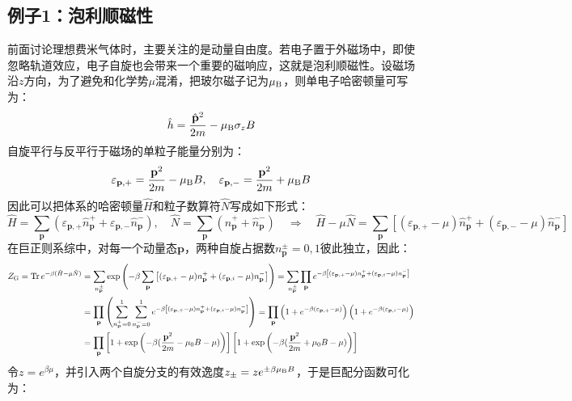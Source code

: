 \newpage
\subsection{例子1：泡利顺磁性}
前面讨论理想费米气体时，主要关注的是动量自由度。若电子置于外磁场中，即使忽略轨道效应，电子自旋也会带来一个重要的磁响应，这就是泡利顺磁性。设磁场沿$z$方向，为了避免和化学势$\mu$混淆，把玻尔磁子记为$\mu_{\rm B}$，则单电子哈密顿量可写为：
\[\hat h=\frac{\hat{\mathbf p}^2}{2m}-\mu_{\rm B}\sigma_z B\]
自旋平行与反平行于磁场的单粒子能量分别为：
\[\varepsilon_{\mathbf p,+}=\frac{\mathbf p^2}{2m}-\mu_{\rm B}B ,\quad \varepsilon_{\mathbf p,-}=\frac{\mathbf p^2}{2m}+\mu_{\rm B}B\]
因此可以把体系的哈密顿量$\hat{H}$和粒子数算符$\hat{N}$写成如下形式：
\[\hat H=\sum_{\mathbf p}\left(\varepsilon_{\mathbf p,+}\hat n_{\mathbf p}^++\varepsilon_{\mathbf p,-}\hat n_{\mathbf p}^-\right),\quad \hat N=\sum_{\mathbf p}\left(\hat n_{\mathbf p}^++\hat n_{\mathbf p}^-\right) \quad \Rightarrow \quad \hat H-\mu\hat N=\sum_{\mathbf p}\left[\left(\varepsilon_{\mathbf p,+}-\mu\right)\hat n_{\mathbf p}^++\left(\varepsilon_{\mathbf p,-}-\mu\right)\hat n_{\mathbf p}^-\right]\]
在巨正则系综中，对每一个动量态$\mathbf p$，两种自旋占据数$n_{\mathbf p}^{\pm}=0,1$彼此独立，因此：
\[\begin{aligned}
Z_{\rm G}=\Tr e^{-\beta(\hat{H}-\mu\hat{N})}&=\sum_{n_{\mathbf{p}}^{\pm}}\exp\left(-\beta\sum_{\mathbf{p}}\left[(\varepsilon_{\mathbf{p},+}-\mu)n_{\mathbf{p}}^++(\varepsilon_{\mathbf{p},i}-\mu)n_{\mathbf{p}}^-\right]\right)=\sum_{n_{\mathbf{p}}^{\pm}}\prod_{\mathbf{p}}e^{-\beta\left[(\varepsilon_{\mathbf{p},+}-\mu)n_{\mathbf{p}}^++(\varepsilon_{\mathbf{p},i}-\mu)n_{\mathbf{p}}^-\right]}\\
&=\prod_{\mathbf{p}}\left(\sum_{n_{\mathbf{p}}^+=0}^1\sum_{n_{\mathbf{p}}^-=0}^1e^{-\beta\left[(\varepsilon_{\mathbf{p},+}-\mu)n_{\mathbf{p}}^++(\varepsilon_{\mathbf{p},i}-\mu)n_{\mathbf{p}}^-\right]}\right)=\prod_{\mathbf{p}}\left(1+e^{-\beta(\varepsilon_{\mathbf{p},+}-\mu)}\right)\left(1+e^{-\beta(\varepsilon_{\mathbf{p},i}-\mu)}\right)\\
&=\prod_{\mathbf{p}}\left[1+\exp\left(-\beta(\frac{\mathbf{p}^2}{2m}-\mu_0B-\mu)\right)\right]\left[1+\exp\left(-\beta(\frac{\mathbf{p}^2}{2m}+\mu_0B-\mu)\right)\right]\\
\end{aligned}\]
令$z=e^{\beta\mu}$，并引入两个自旋分支的有效逸度$z_{\pm}=ze^{\pm\beta\mu_{\rm B}B}$，于是巨配分函数可化为：
